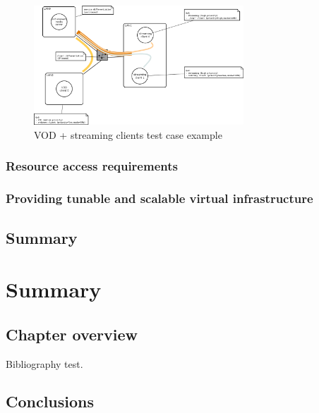 \documentclass[11pt]{book}
\begin{document}
        \begin{figure}[H]
                   \begin{center}
                         \includegraphics[width=0.7\textwidth]{img/test-case/diagram.png}
                         \caption{VOD + streaming clients test case example}
                   \end{center}
        \end{figure}


      \subsection{Resource access requirements}

      \subsection{Providing tunable and scalable virtual infrastructure}


    \section*{Summary}


  \chapter{Summary}

    \section*{Chapter overview}

      Bibliography \cite{mittelbach2004} test.
	
		

    \section{Conclusions}
	
		
\end{document}
